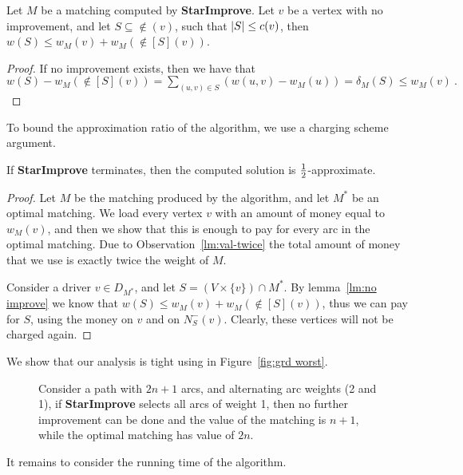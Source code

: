 \begin{lemma}
\label{lm:no improve}
Let $M$ be a matching computed by \textbf{StarImprove}.  Let $v$ be a
vertex with no improvement, and let $S \subseteq \nin(v)$, such that
$\left| S \right| \leq c(v)$, then $w(S) \leq w_M(v) + w_M(\nin[S](v))$.
\end{lemma}
\begin{proof}
If no improvement exists, then we have that \\
\(
w(S) - w_M(\nin[S](v))
=    \sum_{(u,v) \in S} (w(u,v) - w_M(u))
=    \delta_M(S) 
\leq w_M(v)
~.
\)
\end{proof}

To bound the approximation ratio of the algorithm, we use a charging
scheme argument.

\begin{lemma}
If \textbf{StarImprove} terminates, then the computed solution is
$\frac{1}{2}$-approximate.
\end{lemma}
\begin{proof}
Let $M$ be the matching produced by the algorithm, and let $M^*$ be an
optimal matching.  We load every vertex $v$ with an amount of money
equal to $w_M(v)$, and then we show that this is enough to pay for
every arc in the optimal matching.  Due to
Observation~\ref{lm:val-twice} the total amount of money that we use
is exactly twice the weight of $M$.

Consider a driver $v \in D_{M^*}$, and let $S = (V \times \{v\}) \cap
M^*$.  By lemma~\ref{lm:no improve} we know that $w(S) \leq w_M(v) +
w_M(\nin[S](v))$, thus we can pay for $S$, using the money on $v$ and
on $N^-_S(v)$.  Clearly, these vertices will not be charged again.
\end{proof}

We show that our analysis is tight using in Figure~\ref{fig:grd
worst}.

\begin{figure}
\centering

\caption[]{%
Consider a path with $2n + 1$ arcs, and alternating arc weights (2 and
1), if \textbf{StarImprove} selects all arcs of weight 1, then no
further improvement can be done and the value of the matching is $n +
1$, while the optimal matching has value of $2n$.}
\label{fig:grd worst}
\end{figure}

It remains to consider the running time of the algorithm.

